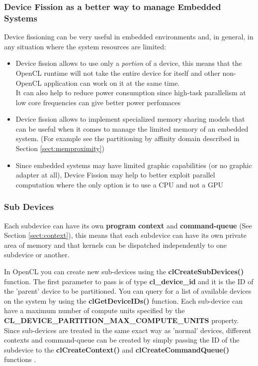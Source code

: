 \subsubsection{Device Fission as a better way to manage Embedded Systems}
Device fissioning can be very useful in embedded environments and, in general, in any situation where the system resources are limited:

\begin{itemize}
	\item Device fission allows to use only a \emph{portion} of a device, this means that the OpenCL runtime will not take the entire device for itself and other non-OpenCL application can work on it at the same time.\\ It can also help to reduce power consumption since high-task parallelism at low core frequencies can give better power perfomaces \cite{leskela:mobileGPGPU}
	\item Device fission allows to implement specialized memory sharing models that can be useful when it comes to manage the limited memory of an embedded system. (For example see the partitioning by affinity domain described in Section \ref{sect:memproximity})
	\item Since embedded systems may have limited graphic capabilities (or no graphic adapter at all), Device Fission may help to better exploit parallel computation where the only option is to use a CPU and not a GPU
\end{itemize}

\subsubsection{Sub Devices} \label{sect:DF-subdevices}
Each subdevice can have its own \textbf{program context} and \textbf{command-queue} (See Section \ref{sect:context}), this means that each subdevice can have its own private area of memory and that kernels can be dispatched independently to one subdevice or another.\\

\begin{CLCode}
In OpenCL you can create new sub-devices using the \textbf{clCreateSubDevices()} function. The first parameter to pass is of type \textbf{cl\_device\_id} and it is the ID of the 'parent' device to be partitioned. You can query for a list of available devices on the system by using the \textbf{clGetDeviceIDs()} function. Each sub-device can have a maximum number of compute units specified by the \textbf{CL\_DEVICE\_PARTITION\_MAX\_COMPUTE\_UNITS} property.
Since sub-devices are treated in the same exact way as 'normal' devices, different contexts and command-queue can be created by simply passing the ID of the subdevice to the \textbf{clCreateContext()} and \textbf{clCreateCommandQueue()} functions .
\label{Code:DevicePartitioning}
\end{CLCode}

